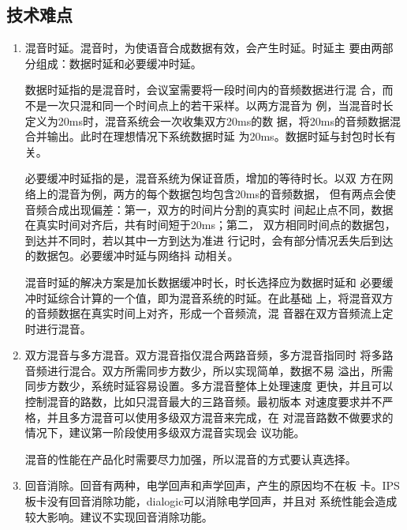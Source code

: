 \documentclass[11pt]{article}
\begin{document}
\subsection{技术难点}
    \begin{enumerate}
        \item 混音时延。混音时，为使语音合成数据有效，会产生时延。时延主
            要由两部分组成：数据时延和必要缓冲时延。
            
            数据时延指的是混音时，会议室需要将一段时间内的音频数据进行混
            合，而不是一次只混和同一个时间点上的若干采样。以两方混音为
            例，当混音时长定义为20ms时，混音系统会一次收集双方20ms的数
            据，将20ms的音频数据混合并输出。此时在理想情况下系统数据时延
            为20ms。数据时延与封包时长有关。
            
            必要缓冲时延指的是，混音系统为保证音质，增加的等待时长。以双
            方在网络上的混音为例，两方的每个数据包均包含20ms的音频数据，
            但有两点会使音频合成出现偏差：第一，双方的时间片分割的真实时
            间起止点不同，数据在真实时间对齐后，共有时间短于20ms；第二，
            双方相同时间点的数据包，到达并不同时，若以其中一方到达为准进
            行记时，会有部分情况丢失后到达的数据包。必要缓冲时延与网络抖
            动相关。

            混音时延的解决方案是加长数据缓冲时长，时长选择应为数据时延和
            必要缓冲时延综合计算的一个值，即为混音系统的时延。在此基础
            上，将混音双方的音频数据在真实时间上对齐，形成一个音频流，混
            音器在双方音频流上定时进行混音。

        \item 双方混音与多方混音。双方混音指仅混合两路音频，多方混音指同时
            将多路音频进行混合。双方所需同步方数少，所以实现简单，数据不易
            溢出，所需同步方数少，系统时延容易设置。多方混音整体上处理速度
            更快，并且可以控制混音的路数，比如只混音最大的三路音频。最初版本
            对速度要求并不严格，并且多方混音可以使用多级双方混音来完成，在
            对混音路数不做要求的情况下，建议第一阶段使用多级双方混音实现会
            议功能。

            混音的性能在产品化时需要尽力加强，所以混音的方式要认真选择。

        \item 回音消除。回音有两种，电学回声和声学回声，产生的原因均不在板
            卡。IPS板卡没有回音消除功能，dialogic可以消除电学回声，并且对
            系统性能会造成较大影响。建议不实现回音消除功能。


\end{enumerate}
\end{document}
